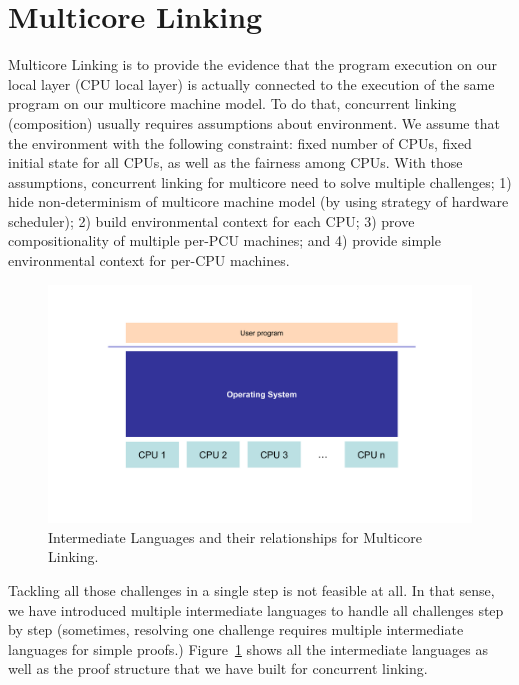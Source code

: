 \section{Multicore Linking}
\label{chapter:linking:sec:multicore-linking}

Multicore Linking is to provide the evidence that the program execution on
our local layer (CPU local layer) is actually connected to the execution of the same program 
on our multicore machine model. 
To do that, concurrent linking (composition) usually requires assumptions about environment. 
We assume that the environment with the following constraint:
fixed number of CPUs, fixed initial state for all CPUs,
as well as the fairness among CPUs.
With those assumptions, 
concurrent linking for multicore 
need to solve multiple challenges;
1) hide non-determinism of multicore machine model (by using strategy of hardware scheduler);
2) build environmental context for each CPU;
3) prove compositionality of multiple per-PCU machines;
and 4) provide simple environmental context for per-CPU machines. 
\begin{figure}
\begin{center}
\includegraphics[width=\textwidth, page=16]{figs/conlink/concurrent_linking}
\end{center}
\caption{Intermediate Languages and their relationships for Multicore Linking.}
\label{fig:chapter:conlink:intermediate-languages-and-their-relationsihps-for-multicore-linking}
\end{figure}
Tackling all those challenges in a single step is not feasible at all. 
In that sense, 
we have introduced multiple intermediate languages 
to handle all challenges step by step (sometimes,
resolving one challenge requires multiple intermediate languages
for simple proofs.) 
Figure~\ref{fig:chapter:conlink:intermediate-languages-and-their-relationsihps-for-multicore-linking} shows
all the intermediate languages as well as the proof structure that we have built for concurrent linking. 

